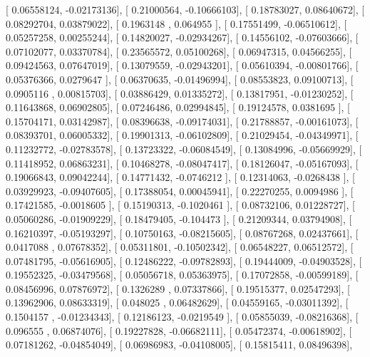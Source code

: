 \documentclass{article}
\begin{document}
       [ 0.06558124, -0.02173136],
       [ 0.21000564, -0.10666103],
       [ 0.18783027,  0.08640672],
       [ 0.08292704,  0.03879022],
       [ 0.1963148 ,  0.064955  ],
       [ 0.17551499, -0.06510612],
       [ 0.05257258,  0.00255244],
       [ 0.14820027, -0.02934267],
       [ 0.14556102, -0.07603666],
       [ 0.07102077,  0.03370784],
       [ 0.23565572,  0.05100268],
       [ 0.06947315,  0.04566255],
       [ 0.09424563,  0.07647019],
       [ 0.13079559, -0.02943201],
       [ 0.05610394, -0.00801766],
       [ 0.05376366,  0.0279647 ],
       [ 0.06370635, -0.01496994],
       [ 0.08553823,  0.09100713],
       [ 0.0905116 ,  0.00815703],
       [ 0.03886429,  0.01335272],
       [ 0.13817951, -0.01230252],
       [ 0.11643868,  0.06902805],
       [ 0.07246486,  0.02994845],
       [ 0.19124578,  0.0381695 ],
       [ 0.15704171,  0.03142987],
       [ 0.08396638, -0.09174031],
       [ 0.21788857, -0.00161073],
       [ 0.08393701,  0.06005332],
       [ 0.19901313, -0.06102809],
       [ 0.21029454, -0.04349971],
       [ 0.11232772, -0.02783578],
       [ 0.13723322, -0.06084549],
       [ 0.13084996, -0.05669929],
       [ 0.11418952,  0.06863231],
       [ 0.10468278, -0.08047417],
       [ 0.18126047, -0.05167093],
       [ 0.19066843,  0.09042244],
       [ 0.14771432, -0.0746212 ],
       [ 0.12314063, -0.0268438 ],
       [ 0.03929923, -0.09407605],
       [ 0.17388054,  0.00045941],
       [ 0.22270255,  0.0094986 ],
       [ 0.17421585, -0.0018605 ],
       [ 0.15190313, -0.1020461 ],
       [ 0.08732106,  0.01228727],
       [ 0.05060286, -0.01909229],
       [ 0.18479405, -0.104473  ],
       [ 0.21209344,  0.03794908],
       [ 0.16210397, -0.05193297],
       [ 0.10750163, -0.08215605],
       [ 0.08767268,  0.02437661],
       [ 0.0417088 ,  0.07678352],
       [ 0.05311801, -0.10502342],
       [ 0.06548227,  0.06512572],
       [ 0.07481795, -0.05616905],
       [ 0.12486222, -0.09782893],
       [ 0.19444009, -0.04903528],
       [ 0.19552325, -0.03479568],
       [ 0.05056718,  0.05363975],
       [ 0.17072858, -0.00599189],
       [ 0.08456996,  0.07876972],
       [ 0.1326289 ,  0.07337866],
       [ 0.19515377,  0.02547293],
       [ 0.13962906,  0.08633319],
       [ 0.048025  ,  0.06482629],
       [ 0.04559165, -0.03011392],
       [ 0.1504157 , -0.01234343],
       [ 0.12186123, -0.0219549 ],
       [ 0.05855039, -0.08216368],
       [ 0.096555  ,  0.06874076],
       [ 0.19227828, -0.06682111],
       [ 0.05472374, -0.00618902],
       [ 0.07181262, -0.04854049],
       [ 0.06986983, -0.04108005],
       [ 0.15815411,  0.08496398],
\end{document}
